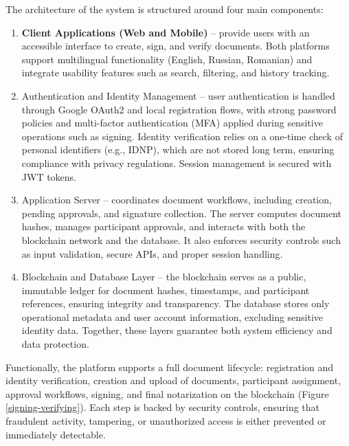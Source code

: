The architecture of the system is structured around four main components:
\begin{enumerate}
    \item \textbf{Client Applications (Web and Mobile)} – provide users with an accessible interface to create, sign, and verify documents. Both platforms support multilingual functionality (English, Russian, Romanian) and integrate usability features such as search, filtering, and history tracking.
    \item Authentication and Identity Management – user authentication is handled through Google OAuth2 and local registration flows, with strong password policies and multi-factor authentication (MFA) applied during sensitive operations such as signing. Identity verification relies on a one-time check of personal identifiers (e.g., IDNP), which are not stored long term, ensuring compliance with privacy regulations. Session management is secured with JWT tokens.
    \item Application Server – coordinates document workflows, including creation, pending approvals, and signature collection. The server computes document hashes, manages participant approvals, and interacts with both the blockchain network and the database. It also enforces security controls such as input validation, secure APIs, and proper session handling.
    \item Blockchain and Database Layer – the blockchain serves as a public, immutable ledger for document hashes, timestamps, and participant references, ensuring integrity and transparency. The database stores only operational metadata and user account information, excluding sensitive identity data. Together, these layers guarantee both system efficiency and data protection.
\end{enumerate}

Functionally, the platform supports a full document lifecycle: registration and identity verification, creation and upload of documents, participant assignment, approval workflows, signing, and final notarization on the blockchain (Figure \ref{signing-verifying}). Each step is backed by security controls, ensuring that fraudulent activity, tampering, or unauthorized access is either prevented or immediately detectable.

